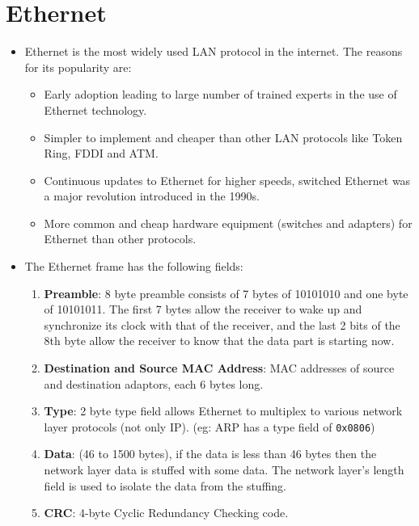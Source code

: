 \documentclass[a4paper]{article}
\theoremstyle{plain}
\theoremstyle{definition}
\begin{document}
\section{Ethernet}
\begin{itemize}
    \item Ethernet is the most widely used LAN protocol in the internet. The reasons for its popularity are:
    \begin{itemize}
        \item Early adoption leading to large number of trained experts in the use of Ethernet technology.
        
        \item Simpler to implement and cheaper than other LAN protocols like Token Ring, FDDI and ATM. 
        
        \item Continuous updates to Ethernet for higher speeds, switched Ethernet was a major revolution introduced in the 1990s. 
        
        \item More common and cheap hardware equipment (switches and adapters) for Ethernet than other protocols.
    \end{itemize}
    
    \item The Ethernet frame has the following fields:
    \begin{enumerate}
        \item \textbf{Preamble}: 8 byte preamble consists of 7 bytes of 10101010 and one byte of 10101011. The first 7 bytes allow the receiver to wake up and synchronize its clock with that of the receiver, and the last 2 bits of the 8th byte allow the receiver to know that the data part is starting now. 
        
        \item \textbf{Destination and Source MAC Address}: MAC addresses of source and destination adaptors, each 6 bytes long. 
        
        \item \textbf{Type}: 2 byte type field allows Ethernet to multiplex to various network layer protocols (not only IP). (eg: ARP has a type field of \texttt{0x0806})
        
        \item \textbf{Data}: (46 to 1500 bytes), if the data is less than 46 bytes then the network layer data is stuffed with some data. The network layer's length field is used to isolate the data from the stuffing. 
        
        \item \textbf{CRC}: 4-byte Cyclic Redundancy Checking code. 
    \end{enumerate}
\end{itemize}
\end{document}
